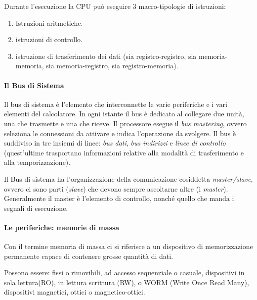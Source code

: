 \documentclass[
  paper=a4,
  oneside  ,captions=tableheading
]{scrbook}
\providecommand{\tightlist}{%
  \setlength{\itemsep}{0pt}\setlength{\parskip}{0pt}}
\begin{document}
Durante l'esecuzione la CPU può eseguire 3 macro-tipologie di
istruzioni:

\begin{enumerate}
\def\labelenumi{\arabic{enumi}.}
\tightlist
\item
  Istruzioni aritmetiche.
\item
  istruzioni di controllo.
\item
  istruzione di trasferimento dei dati (sia registro-registro, sia
  memoria-memoria, sia memoria-registro, sia registro-memoria).
\end{enumerate}

\hypertarget{il-bus-di-sistema}{%
\paragraph{Il Bus di Sistema}\label{il-bus-di-sistema}}

Il bus di sistema è l'elemento che interconnette le varie periferiche e
i vari elementi del calcolatore. In ogni istante il bus è dedicato al
collegare due unità, una che trasmette e una che riceve. Il processore
esegue il \emph{bus mastering}, ovvero seleziona le connessioni da
attivare e indica l'operazione da svolgere. Il bus è suddiviso in tre
insiemi di linee: \emph{bus dati}, \emph{bus indirizzi} e \emph{linee di
controllo} (quest'ultime trasportano informazioni relative alla modalità
di trasferimento e alla temporizzazione).

Il Bus di sistema ha l'organizzazione della comunicazione cosiddetta
\emph{master/slave}, ovvero ci sono parti (\emph{slave}) che devono
sempre ascoltarne altre (i \emph{master}). Generalmente il master è
l'elemento di controllo, nonché quello che manda i segnali di
esecuzione.

\hypertarget{le-periferiche-memorie-di-massa}{%
\paragraph{Le periferiche: memorie di
massa}\label{le-periferiche-memorie-di-massa}}

Con il termine memoria di massa ci si riferisce a un dispositivo di
memorizzazione permanente capace di contenere grosse quantità di dati.

Possono essere: fissi o rimovibili, ad accesso sequenziale o casuale,
dispositivi in sola lettura(RO), in lettura scrittura (RW), o WORM
(Write Once Read Many), dispositivi magnetici, ottici o
magnetico-ottici.
\end{document}
